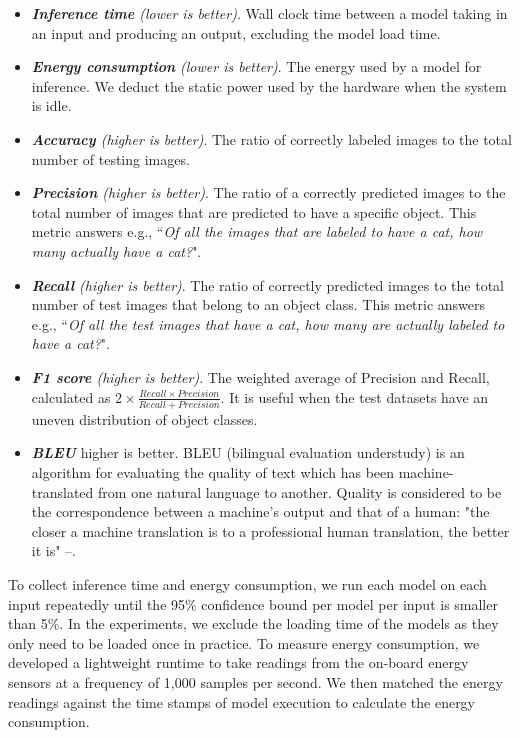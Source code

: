 \begin{itemize}
\item \emph{\textbf{Inference time} (lower is better)}. Wall clock time between a model taking in an input and producing an output,
    excluding the model load time.

\item \emph{\textbf{Energy consumption} (lower is better)}. The energy used by a model for inference.  We deduct the static power used by
    the hardware when the system is idle.

\item \emph{\textbf{Accuracy} (higher is better)}. The ratio of correctly labeled images to the total number of testing images.

\item \emph{\textbf{Precision} (higher is better)}. The ratio of a correctly predicted images to the total number of images that are
    predicted to have a specific object. This metric answers e.g., ``\emph{Of all the images that are labeled to have a cat, how many
    actually have a cat?}".

\item \emph{\textbf{Recall} (higher is better)}. The ratio of correctly predicted images to the total number of test images that belong
    to an object class. This metric answers e.g., ``\emph{Of all the test images that have a cat, how many are actually labeled to have a
    cat?}".

\item \emph{\textbf{F1 score} (higher is better)}.  The weighted average of Precision and Recall, calculated as $2\times\frac{Recall
    \times Precision} {Recall + Precision}$. It is useful when the test datasets have an uneven distribution of object classes.

\item \emph{\textbf{BLEU}} {higher is better}. BLEU (bilingual evaluation understudy) is an algorithm for evaluating the quality of text which has been machine-translated from one natural language to another. Quality is considered to be the correspondence between a machine's output and that of a human: "the closer a machine translation is to a professional human translation, the better it is" –.


\end{itemize}

  To collect inference time and energy consumption, we run each model on each input repeatedly until the
95\% confidence bound per model per input is smaller than 5\%. In the experiments, we exclude the loading time of the \CNN models as they
only need to be loaded once in practice. To measure energy consumption, we developed a lightweight runtime to take readings from the
on-board energy sensors at a frequency of 1,000 samples per second. We then matched the energy readings against the time stamps of model
execution to calculate the energy consumption.
